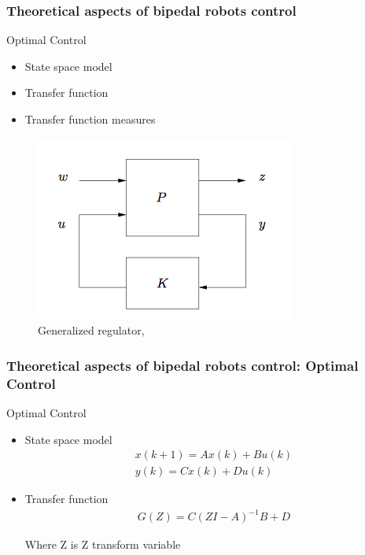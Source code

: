 \documentclass{beamer}
\begin{document}
	\begin{frame}
		\frametitle{Theoretical aspects of bipedal robots control}
		\begin{block}{Optimal Control}
			\begin{itemize}
				\item
					State space model
				\item
					Transfer function
				\item
					Transfer function measures
			\end{itemize}
		\end{block}
		
		\begin{figure}[h!]
			\includegraphics[width=0.5\linewidth]{presentation_images/15}
			\caption{Generalized regulator, \cite{hazell2008discrete}}
		\end{figure}
	\end{frame}


	\begin{frame}
		\frametitle{Theoretical aspects of bipedal robots control: Optimal Control}
		\begin{block}{Optimal Control}
			\begin{itemize}
				\item
					State space model
					\begin{equation}
						\begin{split}
							x(k+1) = Ax(k) + Bu(k)\\
							y(k) = Cx(k) + Du(k)
						\end{split}
					\end{equation}
				\item
					Transfer function
					\begin{equation}
						\begin{split}
							G(Z) = C(ZI - A)^{-1} B + D
						\end{split}
					\end{equation}
					
					Where Z is Z transform variable
			\end{itemize}
		\end{block}
	\end{frame}
	
\end{document}
